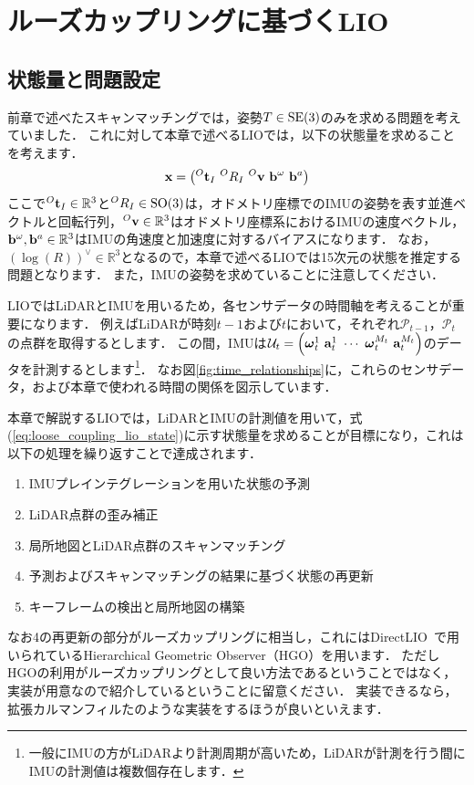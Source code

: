 \chapter{ルーズカップリングに基づくLIO}
\label{sec:loose_coupling_lio}

\section{状態量と問題設定}
\label{eq:state_and_problem_setting_loose_coupling}

前章で述べたスキャンマッチングでは，姿勢$T \in {\rm SE}(3)$のみを求める問題を考えていました．
これに対して本章で述べるLIOでは，以下の状態量を求めることを考えます．
%
\begin{align}
  {\bf x} = \left( {}^{O}{\bf t}_{I} ~ {}^{O}R_{I} ~ {}^{O}{\bf v} ~ {\bf b}^{\omega} ~ {\bf b}^{a} \right)
  \label{eq:loose_coupling_lio_state}
\end{align}
%
ここで${}^{O}{\bf t}_{I} \in \mathbb{R}^{3}$と${}^{O}R_{I} \in {\rm SO}(3)$は，オドメトリ座標でのIMUの姿勢を表す並進ベクトルと回転行列，${}^{O}{\bf v} \in \mathbb{R}^{3}$はオドメトリ座標系におけるIMUの速度ベクトル，${\bf b}^{\omega}, {\bf b}^{a} \in \mathbb{R}^{3}$はIMUの角速度と加速度に対するバイアスになります．
なお，$\left( \log \left( R \right) \right)^{\vee} \in \mathbb{R}^{3}$となるので，本章で述べるLIOでは15次元の状態を推定する問題となります．
また，IMUの姿勢を求めていることに注意してください．

LIOではLiDARとIMUを用いるため，各センサデータの時間軸を考えることが重要になります．
例えばLiDARが時刻$t-1$および$t$において，それぞれ$\mathcal{P}_{t-1}$，$\mathcal{P}_{t}$の点群を取得するとします．
この間，IMUは$\mathcal{U}_{t} = \left( \boldsymbol \omega_{t}^{1} ~ {\bf a}_{t}^{1} ~ \cdots ~ \boldsymbol \omega_{t}^{M_{t}} ~ {\bf a}_{t}^{M_{t}} \right)$のデータを計測するとします\footnote{一般にIMUの方がLiDARより計測周期が高いため，LiDARが計測を行う間にIMUの計測値は複数個存在します．}．
なお図\ref{fig:time_relationships}に，これらのセンサデータ，および本章で使われる時間の関係を図示しています．

本章で解説するLIOでは，LiDARとIMUの計測値を用いて，式(\ref{eq:loose_coupling_lio_state})に示す状態量を求めることが目標になり，これは以下の処理を繰り返すことで達成されます．
%
\begin{enumerate}
  \item IMUプレインテグレーションを用いた状態の予測
  \item LiDAR点群の歪み補正
  \item 局所地図とLiDAR点群のスキャンマッチング
  \item 予測およびスキャンマッチングの結果に基づく状態の再更新
  \item キーフレームの検出と局所地図の構築
\end{enumerate}
%
なお4の再更新の部分がルーズカップリングに相当し，これにはDirectLIO~\cite{DirectLIO}で用いられているHierarchical Geometric Observer（HGO）\cite{Lopez2023arXiv}を用います．
ただしHGOの利用がルーズカップリングとして良い方法であるということではなく，実装が用意なので紹介しているということに留意ください．
実装できるなら，拡張カルマンフィルたのような実装をするほうが良いといえます．

